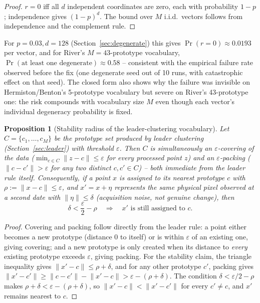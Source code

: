 \documentclass[11pt]{article}
\newtheorem{proposition}{Proposition}
\begin{document}
\begin{proof}
$r=0$ iff all $d$ independent coordinates are zero, each with probability $1-p$; independence gives $(1-p)^d$. The bound over $M$ i.i.d.\ vectors follows from independence and the complement rule. \qedhere
\end{proof}

For $p=0.03, d=128$ (Section~\ref{sec:degenerate}) this gives $\Pr(r=0)\approx 0.0193$ per vector, and for River's $M=43$-prototype vocabulary, $\Pr(\text{at least one degenerate})\approx 0.58$ -- consistent with the empirical failure rate observed before the fix (one degenerate seed out of 10 runs, with catastrophic effect on that seed). The closed form also shows why the failure was invisible on Hermiston/Benton's 5-prototype vocabulary but severe on River's 43-prototype one: the risk compounds with vocabulary size $M$ even though each vector's individual degeneracy probability is fixed.

\begin{proposition}[Stability radius of the leader-clustering vocabulary]
\label{prop:stability}
Let $C=\{c_1,\dots,c_M\}$ be the prototype set produced by leader clustering (Section~\ref{sec:leader}) with threshold $\varepsilon$. Then $C$ is simultaneously an $\varepsilon$-covering of the data ($\min_{c\in C}\lVert z-c\rVert \le \varepsilon$ for every processed point $z$) and an $\varepsilon$-packing ($\lVert c-c'\rVert > \varepsilon$ for any two distinct $c,c'\in C$) -- both immediate from the leader rule itself. Consequently, if a point $x$ is assigned to its nearest prototype $c$ with $\rho := \lVert x-c\rVert \le \varepsilon$, and $x' = x+\eta$ represents the same physical pixel observed at a second date with $\lVert\eta\rVert \le \delta$ (acquisition noise, not genuine change), then
\[
\delta < \frac{\varepsilon}{2}-\rho \quad\Longrightarrow\quad x' \text{ is still assigned to } c.
\]
\end{proposition}

\begin{proof}
Covering and packing follow directly from the leader rule: a point either becomes a new prototype (distance $0$ to itself) or is within $\varepsilon$ of an existing one, giving covering; and a new prototype is only created when its distance to \emph{every} existing prototype exceeds $\varepsilon$, giving packing. For the stability claim, the triangle inequality gives $\lVert x'-c\rVert \le \rho+\delta$, and for any other prototype $c'$, packing gives $\lVert x'-c'\rVert \ge \lVert c-c'\rVert - \lVert x'-c\rVert > \varepsilon-(\rho+\delta)$. The condition $\delta < \varepsilon/2-\rho$ makes $\rho+\delta < \varepsilon-(\rho+\delta)$, so $\lVert x'-c\rVert < \lVert x'-c'\rVert$ for every $c'\neq c$, and $x'$ remains nearest to $c$. \qedhere
\end{proof}
\end{document}
